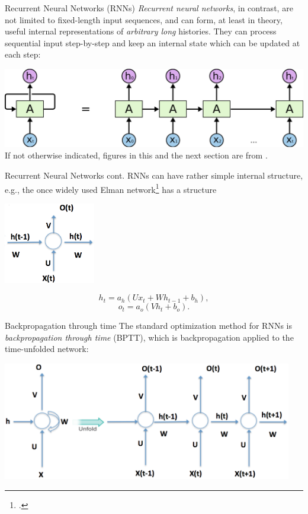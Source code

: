\documentclass[style=upen, size=14pt]{powerdot}
\theoremstyle{definition}
\begin{document}
\begin{slide}[toc=RNNs]{Recurrent Neural Networks (RNNs)}
  \emph{Recurrent neural networks}, in contrast, are not limited to fixed-length
  input sequences, and can form, at least in theory, useful internal
  representations of \emph{arbitrary long} histories. They can process
  sequential input step-by-step and keep an internal state which can be updated
  at each step:
  \begin{center}
    \includegraphics[width=1\textwidth]{figures/RNN-unrolled.eps}
    \footnotesize{If not otherwise indicated, figures in this and the next
      section are from \cite{olah2015understanding}.}
  \end{center}
\end{slide}

\begin{slide}[toc=]{Recurrent Neural Networks cont.}
  RNNs can have rather simple internal structure, e.g., the once widely used
  Elman network\footnote{\cite{elman1990finding}.} has a structure
  \begin{center}
    \includegraphics[width=0.3\textwidth]{figures/elman.eps}
  \end{center}
  $$
  h_t = a_h(U x_t + W h_{t-1} + b_h ),
  $$
  $$
  o_t = a_o(Vh_{t} + b_o ).
  $$
\end{slide}

\begin{slide}[toc=BPTT]{Backpropagation through time}
  The standard optimization method for RNNs is \emph{backpropagation through
    time} (BPTT), which is backpropagation applied to the time-unfolded network:
  \begin{center}
    \includegraphics[width=0.95\textwidth]{figures/rnn_unrolling.eps}
  \end{center}
\end{slide}
\end{document}

